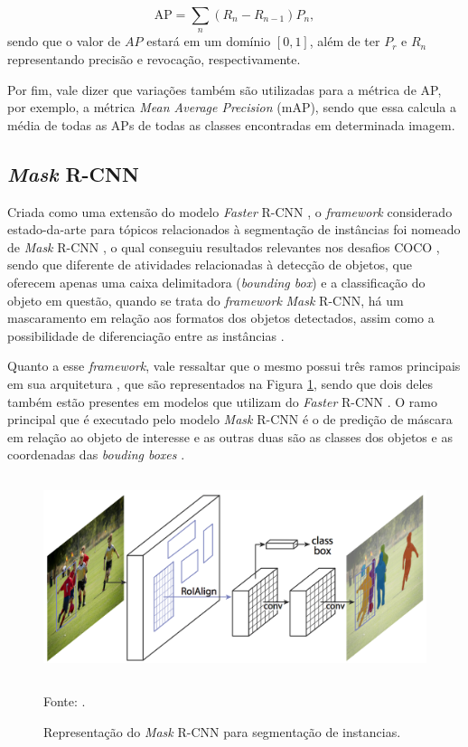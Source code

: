 \begin{equation}
    \label{instance:eq:1}
    \text{AP} = \sum_n (R_n - R_{n-1}) P_n,
\end{equation}
sendo que o valor de $AP$ estará em um domínio $[0,1]$, além de ter $P_r$ e $R_n$ representando precisão e revocação, respectivamente.

Por fim, vale dizer que variações também são utilizadas para a métrica de AP, por exemplo, a métrica \textit{Mean Average Precision} (mAP), sendo que essa calcula a média de todas as APs de todas as classes encontradas em determinada imagem.


\subsection{\textit{Mask} R-CNN}
\label{instance:mask}

Criada como uma extensão do modelo \textit{Faster} R-CNN \cite{Ren2017}, o \textit{framework} considerado estado-da-arte para tópicos relacionados à segmentação de instâncias foi nomeado de \textit{Mask} R-CNN \cite{He2020}, o qual conseguiu resultados relevantes nos desafios COCO \cite{Lin2016}, sendo que diferente de atividades relacionadas à detecção de objetos, que oferecem apenas uma caixa delimitadora (\textit{bounding box}) e a classificação do objeto em questão, quando se trata do \textit{framework} \textit{Mask} R-CNN, há um mascaramento em relação aos formatos dos objetos detectados, assim como a possibilidade de diferenciação entre as instâncias \cite{Hafiz2020}.

Quanto a esse \textit{framework}, vale ressaltar que o mesmo possui três ramos principais em sua arquitetura \cite{He2020, Minaee2021}, que são representados na Figura \ref{instance:fig:2}, sendo que dois deles também estão presentes em modelos que utilizam do \textit{Faster} R-CNN \cite{Ren2017}. O ramo principal que é executado pelo modelo \textit{Mask} R-CNN é o de predição de máscara em relação ao objeto de interesse e as outras duas são as classes dos objetos e as coordenadas das \textit{bouding boxes} \cite{Minaee2021}.

\begin{figure}[H]
    \centering
    \caption{Representação do \textit{Mask} R-CNN para segmentação de instancias.}
    \includegraphics[height=2.3in]{recursos/imagens/instance/Mask-R-CNN_examp.png}
    \label{instance:fig:2}

    \vspace*{1 cm}
    Fonte: \cite{He2020}.
\end{figure}

